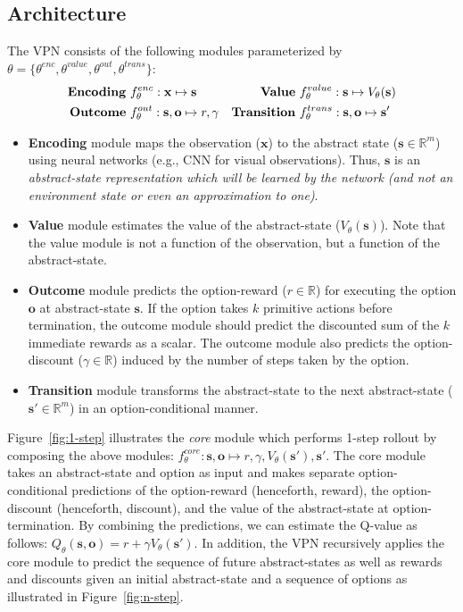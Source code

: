 \documentclass{article}
\newcommand{\option}{o}
\newcommand{\cutsubsectionup}{\vspace*{-0.04in}}
\newcommand{\cutsubsectiondown}{\vspace*{-0.03in}}
\begin{document}
\cutsubsectionup
\subsection{Architecture} \label{sec:arch}
\cutsubsectiondown
The VPN consists of the following modules parameterized by $\theta=\{\theta^{enc},\theta^{value},\theta^{out},\theta^{trans}\}$:
\begin{align*}
\mbox{\textbf{Encoding} } & f^{enc}_{\theta}: \textbf{x} \mapsto \textbf{s} 
& 
\mbox{\textbf{Value} } & f^{value}_{\theta}: \textbf{s} \mapsto V_{\theta}(\textbf{s})  
\\
\mbox{\textbf{Outcome} } & f^{out}_{\theta}: \textbf{s},\textbf{\option{}} \mapsto r,\gamma 
&
\mbox{\textbf{Transition} } & f^{trans}_{\theta}: \textbf{s},\textbf{\option{}} \mapsto \textbf{s}'
\end{align*}
\begin{itemize}[leftmargin=*]
\item \textbf{Encoding} module maps the observation ($\textbf{x}$) to the abstract state ($\textbf{s}\in\mathbb{R}^m$) using neural networks (e.g., CNN for visual observations). Thus, $\textbf{s}$ is an \textit{abstract-state representation which will be learned by the network (and not an environment state or even an approximation to one)}.
\item \textbf{Value} module estimates the value of the abstract-state ($V_{\theta}(\textbf{s})$). Note that the value module is not a function of the observation, but a function of the abstract-state.
\item \textbf{Outcome} module predicts the option-reward ($r\in\mathbb{R}$) for executing the option $\textbf{\option{}}$ at abstract-state $\textbf{s}$. If the option takes $k$ primitive actions before termination, the outcome module should predict the discounted sum of the $k$ immediate rewards as a scalar. The outcome module also predicts the option-discount ($\gamma\in\mathbb{R}$) induced by the number of steps taken by the option. 
\item \textbf{Transition} module transforms the abstract-state to the next abstract-state ($\textbf{s}'\in\mathbb{R}^m$) in an option-conditional manner. 
\end{itemize}

Figure~\ref{fig:1-step} illustrates the \textit{core} module which performs 1-step rollout by composing the above modules: $f^{core}_{\theta}: \textbf{s},\textbf{\option{}} \mapsto r,\gamma,V_{\theta}(\textbf{s}'),\textbf{s}'$. The core module takes an abstract-state and option as input and makes separate option-conditional predictions of the option-reward (henceforth, reward), the option-discount (henceforth, discount), and the value of the  abstract-state at option-termination. By combining the predictions, we can estimate the Q-value  as follows: $Q_{\theta}(\textbf{s},\textbf{\option{}})=r+\gamma V_{\theta}(\textbf{s}')$. In addition, the VPN recursively applies the core module to predict the sequence of future abstract-states as well as rewards and discounts 
given an initial abstract-state and a sequence of options as illustrated in Figure~\ref{fig:n-step}.
\end{document}
